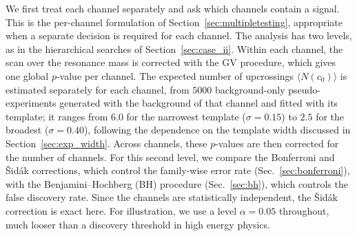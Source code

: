 We first treat each channel separately and ask which channels contain a signal. This is the per-channel formulation of Section~\ref{sec:multipletesting}, appropriate when a separate decision is required for each channel. The analysis has two levels, as in the hierarchical searches of Section~\ref{sec:case_ii}. Within each channel, the scan over the resonance mass is corrected with the GV procedure, which gives one global $p$-value per channel. The expected number of upcrossings $\langle N(c_0)\rangle$ is estimated separately for each channel, from $5000$ background-only pseudo-experiments generated with the background of that channel and fitted with its template; it ranges from $6.0$ for the narrowest template ($\sigma=0.15$) to $2.5$ for the broadest ($\sigma=0.40$), following the dependence on the template width discussed in Section~\ref{sec:exp_width}. Across channels, these $p$-values are then corrected for the number of channels. For this second level, we compare the Bonferroni and \v{S}id\'ak corrections, which control the family-wise error rate (Sec.~\ref{sec:bonferroni}), with the Benjamini--Hochberg (BH) procedure (Sec.~\ref{sec:bh}), which controls the false discovery rate. Since the channels are statistically independent, the \v{S}id\'ak correction is exact here. For illustration, we use a level $\alpha=0.05$ throughout, much looser than a discovery threshold in high energy physics.
